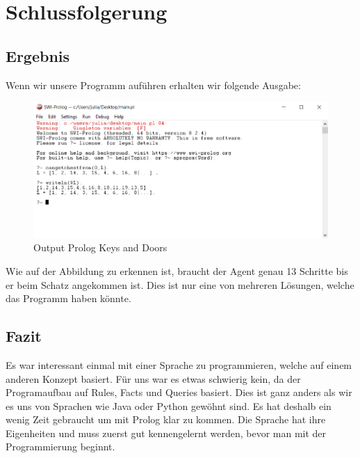 \chapter{Schlussfolgerung}

\section{Ergebnis}
Wenn wir unsere Programm auführen erhalten wir folgende Ausgabe:

\begin{figure}[h]
    \begin{center}
        \includegraphics[width=1\textwidth]{content/pictures/output.png}
        \caption{Output Prolog Keys and Doors}
        \label{fig:output}
    \end{center}
\end{figure}

\noindent
Wie auf der Abbildung zu erkennen ist, braucht der Agent genau 13 Schritte bis
er beim Schatz angekommen ist. Dies ist nur eine von mehreren Lösungen, welche 
das Programm haben könnte.

\section{Fazit}
Es war interessant einmal mit einer Sprache zu programmieren, welche auf einem anderen Konzept basiert.
Für uns war es etwas schwierig kein, da der Programaufbau auf Rules, Facts und Queries basiert.
Dies ist ganz anders als wir es uns von Sprachen wie Java oder Python gewöhnt sind. Es hat deshalb
ein wenig Zeit gebraucht um mit Prolog klar zu kommen.
Die Sprache hat ihre Eigenheiten und muss zuerst gut kennengelernt werden, bevor man mit der
Programmierung beginnt.  